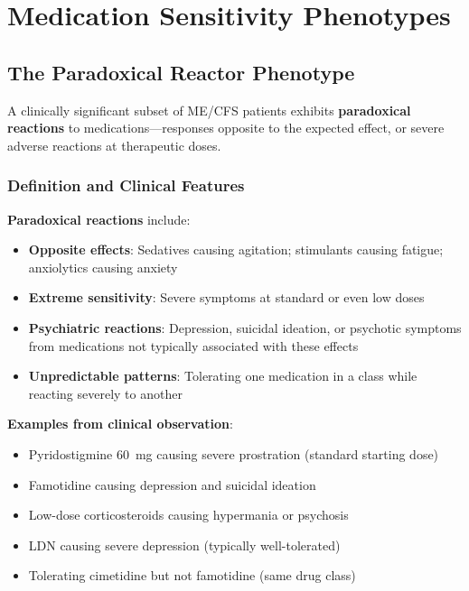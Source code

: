 \section{Medication Sensitivity Phenotypes}
\label{sec:med-sensitivity}

\subsection{The Paradoxical Reactor Phenotype}
\label{sec:paradoxical-reactor}

A clinically significant subset of ME/CFS patients exhibits \textbf{paradoxical reactions} to medications---responses opposite to the expected effect, or severe adverse reactions at therapeutic doses.

\subsubsection{Definition and Clinical Features}

\textbf{Paradoxical reactions} include:
\begin{itemize}
    \item \textbf{Opposite effects}: Sedatives causing agitation; stimulants causing fatigue; anxiolytics causing anxiety
    \item \textbf{Extreme sensitivity}: Severe symptoms at standard or even low doses
    \item \textbf{Psychiatric reactions}: Depression, suicidal ideation, or psychotic symptoms from medications not typically associated with these effects
    \item \textbf{Unpredictable patterns}: Tolerating one medication in a class while reacting severely to another
\end{itemize}

\textbf{Examples from clinical observation}:
\begin{itemize}
    \item Pyridostigmine 60~mg causing severe prostration (standard starting dose)
    \item Famotidine causing depression and suicidal ideation
    \item Low-dose corticosteroids causing hypermania or psychosis
    \item LDN causing severe depression (typically well-tolerated)
    \item Tolerating cimetidine but not famotidine (same drug class)
\end{itemize}

